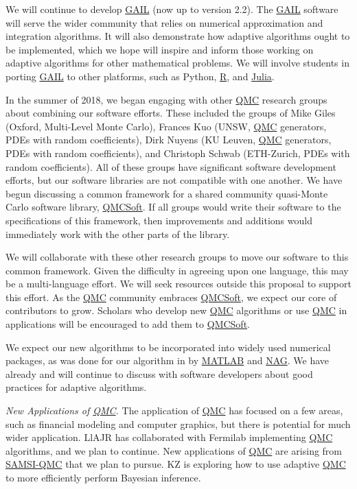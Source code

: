 \documentclass[11pt]{NSFamsart}
\newcommand{\QMCSoft}{\hyperlink{QMCSoftlink}{QMCSoft}\xspace}
\newcommand{\GAIL}{\hyperlink{GAILlink}{GAIL}\xspace}
\newcommand{\QMC}{\hyperlink{QMClink}{QMC}\xspace}
\newcommand{\SAMSIQMC}{\hyperlink{SAMSIlink}{SAMSI-QMC}\xspace}
\newcommand{\NAG}{\hyperlink{NAGlink}{NAG}\xspace}
\newcommand{\MATLAB}{\hyperlink{MATLABlink}{MATLAB}\xspace}
\newcommand{\Rlang}{\hyperlink{Rlink}{R}\xspace}
\newcommand{\Julia}{\hyperlink{Julialink}{Julia}\xspace}
\begin{document}
We will continue to develop \GAIL \citep{ChoEtal17b} (now up to version 2.2).  The \GAIL software 
will serve the wider community that relies on numerical approximation and integration algorithms.  It will 
also demonstrate how adaptive algorithms ought to be implemented, which we hope will inspire and 
inform those working on adaptive algorithms for other mathematical problems.  We will involve 
students in porting \GAIL to other platforms, such as Python, \Rlang, and \Julia.  

In the summer of 2018, we began engaging with other \QMC research groups about combining our software efforts.  These included the groups of Mike Giles (Oxford, Multi-Level Monte Carlo),  Frances Kuo (UNSW, \QMC generators, PDEs with random coefficients),  Dirk Nuyens (KU Leuven, \QMC generators, PDEs with random coefficients), and Christoph Schwab (ETH-Zurich, PDEs with random coefficients).  All of these groups have significant software development efforts, but our software libraries are not compatible with one another.  We have begun discussing a common framework for a shared community quasi-Monte Carlo software library, \QMCSoft.  If all groups would write their software to the specifications of this framework, then improvements and additions would immediately work with the other parts of the library.

We will collaborate with these other research groups to move our software to this common framework.  Given the difficulty in agreeing upon one language, this may be a multi-language effort.  We will seek resources outside this proposal to support this effort.  As the \QMC community embraces \QMCSoft, we expect our core of contributors to grow.  Scholars who develop new \QMC algorithms or use \QMC in applications will be encouraged to add them to \QMCSoft.  

We expect our new algorithms to be incorporated into widely used numerical packages, as was done for our algorithm in \cite{HonHic00a} by \MATLAB and \NAG.  We have already and will continue 
to discuss with software developers about good practices for adaptive algorithms.


\emph{New Applications of \QMC.}
The application of \QMC has focused on a few areas, such as financial modeling and computer 
graphics, but there is potential for much wider application.  LlAJR has collaborated with Fermilab implementing \QMC algorithms, and we plan to continue.    New applications of \QMC are arising from \SAMSIQMC that we plan to pursue.  KZ is exploring how to use adaptive \QMC to more efficiently perform Bayesian inference.


\newpage
\clearpage
\setcounter{page}{1}




{\renewcommand\addcontentsline[3]{} 
\renewcommand{\refname}{{\Large\textbf{References Cited}}}                   %
\renewcommand{\bibliofont}{\normalsize}

}
\end{document}
